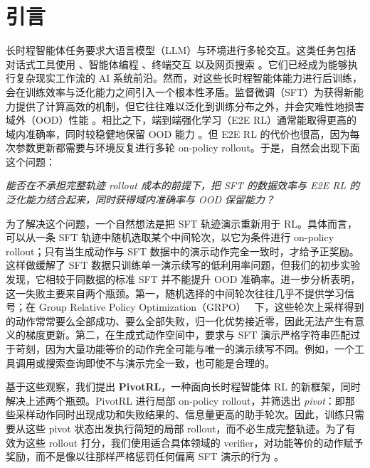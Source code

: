 \section{引言}

长时程智能体任务要求大语言模型（LLM）与环境进行多轮交互。这类任务包括对话式工具使用 \citep{schick2023toolformer, qin2023toolllm}、智能体编程 \citep{jimenez2024swebench}、终端交互 \citep{xie2024osworld} 以及网页搜索 \citep{yao2022webshop, wei2025browsecompsimplechallengingbenchmark}。它们已经成为能够执行复杂现实工作流的 AI 系统前沿。然而，对这些长时程智能体能力进行后训练，会在训练效率与泛化能力之间引入一个根本性矛盾。监督微调（SFT）为获得新能力提供了计算高效的机制，但它往往难以泛化到训练分布之外，并会灾难性地损害域外（OOD）性能 \citep{chu2025sftmemorizesrlgeneralizes, luo2023empiricalCF}。相比之下，端到端强化学习（E2E RL）通常能取得更高的域内准确率，同时较稳健地保留 OOD 能力 \citep{ouyang2022training, chen2025retainingdoingroleonpolicy}。但 E2E RL 的代价也很高，因为每次参数更新都需要与环境反复进行多轮 on-policy rollout。于是，自然会出现下面这个问题：
\begin{center}
    \emph{能否在不承担完整轨迹 rollout 成本的前提下，把 SFT 的数据效率与 E2E RL 的泛化能力结合起来，同时获得域内准确率与 OOD 保留能力？}
\end{center}
为了解决这个问题，一个自然想法是把 SFT 轨迹演示重新用于 RL。具体而言，可以从一条 SFT 轨迹中随机选取某个中间轮次，以它为条件进行 on-policy rollout；只有当生成动作与 SFT 数据中的演示动作完全一致时，才给予正奖励。这样做缓解了 SFT 数据只训练单一演示续写的低利用率问题，但我们的初步实验发现，它相较于同数据的标准 SFT 并不能提升 OOD 准确率。进一步分析表明，这一失败主要来自两个瓶颈。第一，随机选择的中间轮次往往几乎不提供学习信号；在 Group Relative Policy Optimization（GRPO）~\citep{shao2024deepseekmath} 下，这些轮次上采样得到的动作常常要么全部成功、要么全部失败，归一化优势接近零，因此无法产生有意义的梯度更新。第二，在生成式动作空间中，要求与 SFT 演示严格字符串匹配过于苛刻，因为大量功能等价的动作完全可能与唯一的演示续写不同。例如，一个工具调用或搜索查询即使不与演示完全一致，也可能是合理的。

基于这些观察，我们提出 \textbf{PivotRL}，一种面向长时程智能体 RL 的新框架，同时解决上述两个瓶颈。PivotRL 进行局部 on-policy rollout，并筛选出 \emph{pivot}：即那些采样动作同时出现成功和失败结果的、信息量更高的助手轮次。因此，训练只需要从这些 pivot 状态出发执行简短的局部 rollout，而不必生成完整轨迹。为了有效为这些 rollout 打分，我们使用适合具体领域的 verifier，对功能等价的动作赋予奖励，而不是像以往那样严格惩罚任何偏离 SFT 演示的行为 \citep{shao2024deepseekmath, rohatgi2025tamingprocessverifiers}。


